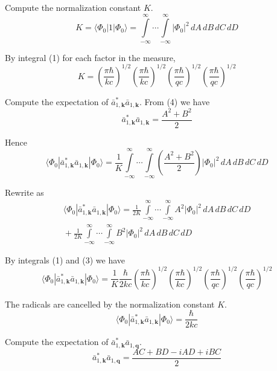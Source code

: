 \documentclass[12pt]{article}
\newcommand\U{\vert\Phi_0\vert^2}
\begin{document}
Compute the normalization constant $K$.
\begin{equation*}
K=\langle\Phi_0|1|\Phi_0\rangle
=\int\limits_{-\infty}^\infty\cdots\int\limits_{-\infty}^\infty
\U\,dA\,dB\,dC\,dD
\end{equation*}

By integral (1) for each factor in the measure,
\begin{equation*}
K=
\left(\frac{\pi\hbar}{kc}\right)^{1/2}
\left(\frac{\pi\hbar}{kc}\right)^{1/2}
\left(\frac{\pi\hbar}{qc}\right)^{1/2}
\left(\frac{\pi\hbar}{qc}\right)^{1/2}
\end{equation*}

Compute the expectation of $\bar a_{1,\mathbf k}^*\bar a_{1,\mathbf k}$.
From (4) we have
\begin{equation*}
\bar a_{1,\mathbf k}^*\bar a_{1,\mathbf k}=\frac{A^2+B^2}{2}
\end{equation*}

Hence
\begin{equation*}
\langle\Phi_0|\bar a_{1,\mathbf k}^*\bar a_{1,\mathbf k}|\Phi_0\rangle
=\frac{1}{K}\int\limits_{-\infty}^\infty\cdots\int\limits_{-\infty}^\infty
\left(\frac{A^2+B^2}{2}\right)
\U\,dA\,dB\,dC\,dD
\end{equation*}

Rewrite as
\begin{multline*}
\langle\Phi_0|\bar a_{1,\mathbf k}^*\bar a_{1,\mathbf k}|\Phi_0\rangle
=\frac{1}{2K}
\int\limits_{-\infty}^\infty\cdots\int\limits_{-\infty}^\infty
A^2
\U\,dA\,dB\,dC\,dD
\\{}+
\frac{1}{2K}
\int\limits_{-\infty}^\infty\cdots\int\limits_{-\infty}^\infty
B^2
\U\,dA\,dB\,dC\,dD
\end{multline*}

By integrals (1) and (3) we have
\begin{equation*}
\langle\Phi_0|\bar a_{1,\mathbf k}^*\bar a_{1,\mathbf k}|\Phi_0\rangle
=\frac{1}{K}\frac{\hbar}{2kc}
\left(\frac{\pi\hbar}{kc}\right)^{1/2}
\left(\frac{\pi\hbar}{kc}\right)^{1/2}
\left(\frac{\pi\hbar}{qc}\right)^{1/2}
\left(\frac{\pi\hbar}{qc}\right)^{1/2}
\end{equation*}

The radicals are cancelled by the normalization constant $K$.
\begin{equation*}
\langle\Phi_0|\bar a_{1,\mathbf k}^*\bar a_{1,\mathbf k}|\Phi_0\rangle=\frac{\hbar}{2kc}
\tag{5}
\end{equation*}

Compute the expectation of $\bar a_{1,\mathbf k}^*\bar a_{1,\mathbf q}$.
\begin{equation*}
\bar a_{1,\mathbf k}^*\bar a_{1,\mathbf q}
=\frac{AC+BD-iAD+iBC}{2}
\end{equation*}
\end{document}
